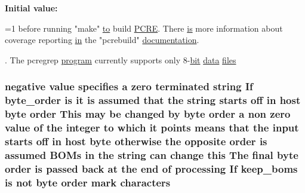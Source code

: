 {\bfseries Initial value\+:}
\begin{DoxyCode}
=1 before
  running \textcolor{stringliteral}{"make"} \hyperlink{group__MOD__PROXY_ga4d80b46c1e04eba6561893714933df30}{to} build \hyperlink{pcre_8txt_a71e4557e7248fceb9478528030bfb7a5}{PCRE}. There \hyperlink{pcre_8txt_a7d947c770a43ed118ff283c41a1b303c}{is} more information about coverage
  reporting \hyperlink{group__apr__thread__proc_ga2e46fea00cc2238744ebca5061c62bcc}{in} the \textcolor{stringliteral}{"pcrebuild"} \hyperlink{pcre_8txt_a5c227f81d9a06a8bc0cfd7b51643c528}{documentation}.

. The pcregrep \hyperlink{group__APACHE__CORE__LOG_gac21a604824a10f311a4fad1d701f5115}{program} currently supports only 8-\hyperlink{pcre-config_8txt_aeddb586b79a44fb202dde924852cbbf6}{bit} \hyperlink{structdata}{data} \hyperlink{README_8txt_a712d293ec6980bb1cea7fb065efecde8}{files}
\end{DoxyCode}
\subsubsection[{\texorpdfstring{characters}{characters}}]{ negative {\bf value} specifies {\bf a} {\bf zero} terminated {\bf string} If byte\+\_\+order {\bf is} {\bf it} {\bf is} assumed that the {\bf string} starts off {\bf in} {\bf host} byte {\bf order} This may {\bf be} changed by byte {\bf order} {\bf a} non {\bf zero} {\bf value} {\bf of} the integer {\bf to} {\bf which} {\bf it} points means that the {\bf input} starts off {\bf in} {\bf host} byte otherwise the opposite {\bf order} {\bf is} assumed B\+O\+Ms {\bf in} the {\bf string} {\bf can} change {\bf this} The final byte {\bf order} {\bf is} passed back at the {\bf end} {\bf of} processing If keep\+\_\+boms {\bf is} {\bf not} byte {\bf order} {\bf mark} characters}\hypertarget{README_8txt_a5ece3e707c80b491ab16a0d3c98b7fd7}{}\label{README_8txt_a5ece3e707c80b491ab16a0d3c98b7fd7}
